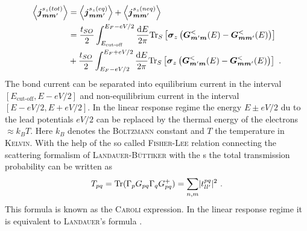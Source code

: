 \begin{align}
\left< \boldsymbol{j}_{\boldsymbol{m}\boldsymbol{m}'}^{s_z(tot)} \right> &=\left< \boldsymbol{j}_{\boldsymbol{m}\boldsymbol{m}'}^{s_z(eq)} \right>+ \left< \boldsymbol{j}_{\boldsymbol{m}\boldsymbol{m}'}^{s_z(neq)} \right>\\
	&=\frac{t_{SO}}{2} \int_{E_{\text{cut-off}}}^{E_F-eV/2} \frac{\text{d}E}{2 \pi} \text{Tr}_S \left[\boldsymbol{\sigma}_z\left(\boldsymbol{G}^<_{\boldsymbol{m}'\boldsymbol{m}}(E)- \boldsymbol{G}^<_{\boldsymbol{m}\boldsymbol{m}'}(E)\right)\right]\\
	&+\frac{t_{SO}}{2} \int_{E_F-eV/2}^{E_F+eV/2} \frac{\text{d}E}{2 \pi} \text{Tr}_S \left[\boldsymbol{\sigma}_z\left(\boldsymbol{G}^<_{\boldsymbol{m}'\boldsymbol{m}}(E)- \boldsymbol{G}^<_{\boldsymbol{m}\boldsymbol{m}'}(E)\right)\right] \ .
	\label{eqn:gfnccurrent}
\end{align}
The bond current can be separated into equilibrium current in the interval $[E_{\text{cut-off}}, E-eV/2]$ and non-equilibrium current in the interval $[E-eV/2, E+eV/2]$. In the linear response regime the energy $E\pm eV/2$ du to the lead potentials $eV/2$ can be replaced by the thermal energy of the electrons $\approx k_B T$. Here $k_B$ denotes the \textsc{Boltzmann} constant and $T$ the temperature in \textsc{Kelvin}.
With the help of the so called \textsc{Fisher-Lee} relation \cite{PhysRevB.23.6851} connecting the scattering formalism of \textsc{Landauer-B\"uttiker} with the \gfnc s the total transmission probability can be written as
\begin{align}
T_{pq} = \text{Tr}(\Gamma_p G_{pq} \Gamma_q G^+_{pq}) = \sum_{n,m} \lvert t^{pq}_{ll'}\rvert^2\ .
\label{eqn:transmissionfunction}
\end{align}
This formula is known as the \textsc{Caroli} expression. In the linear response regime it is equivalent to \textsc{Landauer}'s formula \cite{PhysRevB.72.035450}.
